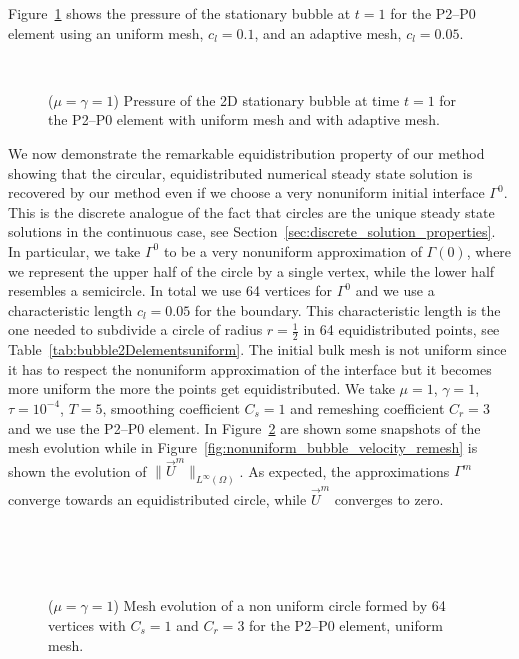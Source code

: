 \documentclass[a4paper,12pt,onecolumn]{article}
\begin{document}
Figure~\ref{fig:2d_stationary_bubble} shows the pressure of the stationary bubble at $t=1$ for the P2--P0 element using an uniform mesh, $c_l=0.1$, and an adaptive mesh, $c_l=0.05$.
\begin{figure}[htbp]
  \centering
  \quad
  \\
  \caption{($\mu=\gamma=1$) Pressure of the 2D stationary bubble at time $t=1$ for the P2--P0 element with uniform mesh and with adaptive mesh.}
  \label{fig:2d_stationary_bubble}
\end{figure}

We now demonstrate the remarkable equidistribution property of our method showing that the circular, equidistributed numerical steady state solution is recovered by our method even if we choose a very nonuniform initial interface $\Gamma^0$. This is the discrete analogue of the fact that circles are the unique steady state solutions in the continuous case, see Section~\ref{sec:discrete_solution_properties}. In particular, we take $\Gamma^0$ to be a very nonuniform approximation of $\Gamma(0)$, where we represent the upper half of the circle by a single vertex, while the lower half resembles a semicircle. In total we use 64 vertices for $\Gamma^0$ and we use a characteristic length $c_l=0.05$ for the boundary. This characteristic length is the one needed to subdivide a circle of radius $r=\frac{1}{2}$ in 64 equidistributed points, see Table~\ref{tab:bubble2Delementsuniform}. The initial bulk mesh is not uniform since it has to respect the nonuniform approximation of the interface but it becomes more uniform the more the points get equidistributed. We take $\mu=1$, $\gamma=1$, $\tau=10^{-4}$, $T=5$, smoothing coefficient $C_s=1$ and remeshing coefficient $C_r=3$ and we use the P2--P0 element. In Figure~\ref{fig:nonuniform_bubble_remesh} are shown some snapshots of the mesh evolution while in Figure~\ref{fig:nonuniform_bubble_velocity_remesh} is shown the evolution of $\|\vec U^m\|_{L^\infty(\Omega)}$. As expected, the approximations $\Gamma^m$ converge towards an equidistributed circle, while $\vec U^m$ converges to zero.
\begin{figure}[htbp]
  \centering
  \\
  \quad
  \\
  \quad
  \\
  \caption{($\mu=\gamma=1$) Mesh evolution of a non uniform circle formed by 64 vertices with $C_s=1$ and $C_r=3$ for the P2--P0 element, uniform mesh.}
  \label{fig:nonuniform_bubble_remesh}
\end{figure}
\end{document}
